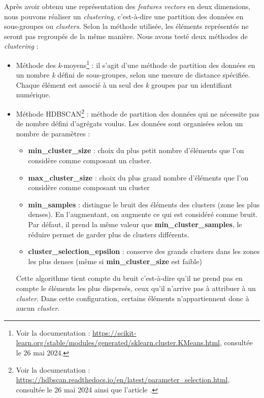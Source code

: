 Après avoir obtenu une représentation des \textit{features vectors} en deux dimensions, nous pouvons réaliser un \textit{clustering}, c'est-à-dire une partition des données en sous-groupes ou \textit{clusters}. Selon la méthode utilisée, les éléments représentés ne seront pas regroupés de la même manière. Nous avons testé deux méthodes de \textit{clustering} : 
\begin{itemize}
	\item Méthode des \textit{k}-moyens\footnote{Voir la documentation : \url{https://scikit-learn.org/stable/modules/generated/sklearn.cluster.KMeans.html}, consultée le 26 mai 2024.} : il s'agit d'une méthode de partition des données en un nombre \textit{k} défini de sous-groupes, selon une mesure de distance spécifiée. Chaque élément est associé à un seul des \textit{k} groupes par un identifiant numérique.
	\item Méthode HDBSCAN\footnote{Voir la documentation : \url{https://hdbscan.readthedocs.io/en/latest/parameter_selection.html}, consultée le 26 mai 2024 ainsi que l'article \cite{mcinnesHdbscanHierarchicalDensity2017}.} : méthode de partition des données qui ne nécessite pas de nombre défini d'agrégats voulus. Les données sont organisées selon un nombre de paramètres : 
	\begin{itemize}
		\item \textbf{min\_cluster\_size} : choix du plus petit nombre d'éléments que l'on considère comme composant un cluster.
		\item \textbf{max\_cluster\_size} : choix du plus grand nombre d'éléments que l'on considère comme composant un cluster
		\item \textbf{min\_samples} : distingue le bruit des éléments des clusters (zone les plus denses). En l'augmentant, on augmente ce qui est considéré comme bruit. Par défaut, il prend la même valeur que \textbf{min\_cluster\_samples}, le réduire permet de garder plus de clusters différents.
		\item \textbf{cluster\_selection\_epsilon} : conserve des grands clusters dans les zones les plus denses (même si \textbf{min\_cluster\_size} est faible)
	\end{itemize}
Cette algorithme tient compte du bruit c'est-à-dire qu'il ne prend pas en compte le éléments les plus dispersés, ceux qu'il n'arrive pas à attribuer à un \textit{cluster}. Dans cette configuration, certains éléments n'appartiennent donc à aucun \textit{cluster}. \\
\end{itemize}

